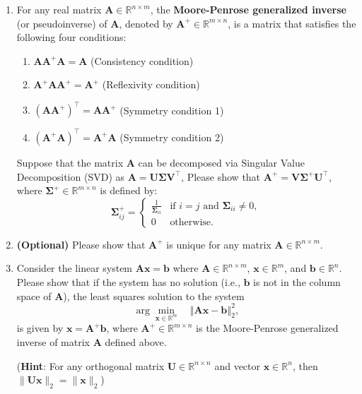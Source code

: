 \documentclass[11pt,letter,notitlepage]{article}
\theoremstyle{definition}
\begin{document}
\newpage
\begin{exercise}
    \begin{enumerate}
    \item 
    For any real matrix $\mathbf{A}\in\mathbb{R}^{n\times m}$, the \textbf{Moore-Penrose generalized inverse} (or pseudoinverse) of $\mathbf{A}$, denoted by $\mathbf{A}^+\in\mathbb{R}^{m\times n}$, is a matrix that satisfies the following four conditions:

        \begin{enumerate}
            \item $\mathbf{A}\mathbf{A}^+\mathbf{A} = \mathbf{A}$ \hfill (Consistency condition)
            \item $\mathbf{A}^+\mathbf{A}\mathbf{A}^+ = \mathbf{A}^+$ \hfill (Reflexivity condition)
            \item $(\mathbf{A}\mathbf{A}^+)^\top = \mathbf{A}\mathbf{A}^+$ \hfill (Symmetry condition 1)
            \item $(\mathbf{A}^+\mathbf{A})^\top = \mathbf{A}^+\mathbf{A}$ \hfill (Symmetry condition 2)
        \end{enumerate}
    Suppose that the matrix \( \mathbf{A} \) can be decomposed via Singular Value Decomposition (SVD) as \( \mathbf{A} = \mathbf{U}\boldsymbol{\Sigma} \mathbf{V}^\top \), Please show that $\mathbf{A}^+ = \mathbf{V}\boldsymbol\Sigma^{+} \mathbf{U}^\top$, where $ \boldsymbol \Sigma^+ \in\mathbb{R}^{m\times n} $ is defined by:
    \[
    \boldsymbol\Sigma^+_{ij} = 
    \begin{cases} 
    \frac{1}{\boldsymbol\Sigma_{ii}} & \text{if } i = j \text{ and } \boldsymbol \Sigma_{ii} \neq 0, \\
    0 & \text{otherwise}.
    \end{cases}
    \]
    
    
    \item \textbf{(Optional)} Please show that $\mathbf{A}^+$ is unique for any matrix $\mathbf{A}\in\mathbb{R}^{n\times m}$.

    \item Consider the linear system $\mathbf{A}\mathbf{x} = \mathbf{b}$ where $\mathbf{A}\in\mathbb{R}^{n\times m}$, $\mathbf{x} \in \mathbb{R}^m$, and $\mathbf{b} \in \mathbb{R}^n$. Please show that if the system has no solution (i.e., $\mathbf{b}$ is not in the column space of $\mathbf{A}$), the least squares solution to the system
    $$
    \arg \min_{\mathbf{x}\in\mathbb{R}^m}\quad \left\Vert \mathbf{A}\mathbf{x} - \mathbf b \right\Vert_2^2,
    $$
    is given by $\mathbf{x} = \mathbf A^ + \mathbf b$, where $\mathbf{A}^+\in\mathbb{R}^{m\times n}$ is the Moore-Penrose generalized inverse of matrix $\mathbf{A}$ defined above.

    (\textbf{Hint}: For any orthogonal matrix $\mathbf{U}\in\mathbb{R}^{n\times n}$ and vector $\mathbf{x}\in\mathbb{R}^n$, then $\|\mathbf{U}\mathbf{x}\|_2 = \|\mathbf{x}\|_2$)
\end{enumerate}
\end{exercise}

	
	\newpage
	\newpage
    
    
	
\end{document}
